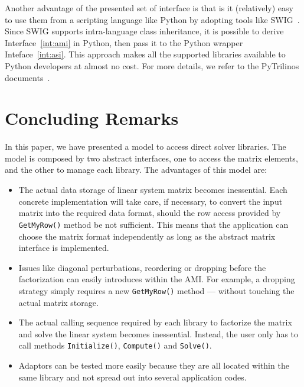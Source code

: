 \documentclass[acmtocl]{acmtrans2m}
\begin{document}
Another advantage of the presented set of interface is that is it (relatively)
  easy to use them from a scripting language like Python by adopting tools
  like SWIG~\cite{swig}. Since SWIG supports intra-language class inheritance,
  it is possible to derive Interface~\ref{int:ami} in Python, then pass it
  to the Python wrapper Inteface~\ref{int:asi}. This approach makes all the
  supported libraries available to Python developers at almost no cost. For
  more details, we refer to the PyTrilinos
  documents~\cite{sala05pytrilinos,pytrilinos-la-guide}. 
  
\section{Concluding Remarks}
\label{sec:conclusions}

In this paper, we have presented a model to access direct
solver libraries. The model is composed by two abstract interfaces, one to
access the matrix elements, and the other to manage each library.
The advantages of this model are:
\begin{itemize}

\item The actual data storage of linear system matrix becomes inessential.
Each concrete implementation will take care, if necessary, to convert the
input matrix into the required data format, should the row access provided by
\verb!GetMyRow()! method be not sufficient. This means that the
application can choose the matrix format independently as long as the abstract
matrix interface is implemented.

\item Issues like diagonal perturbations, reordering or dropping before the
 factorization can easily introduces within the AMI. For example, a dropping
 strategy simply requires a new \verb!GetMyRow()! method --- without
 touching the actual matrix storage.

\item The actual calling sequence required by each library to factorize the
matrix and solve the linear system becomes inessential. Instead, the user only
has to call methods \verb!Initialize()!, \verb!Compute()! and
\verb!Solve()!.

\item Adaptors can be tested more easily because they are all located within
the same library and not spread out into several application codes.
\end{itemize}
\end{document}
